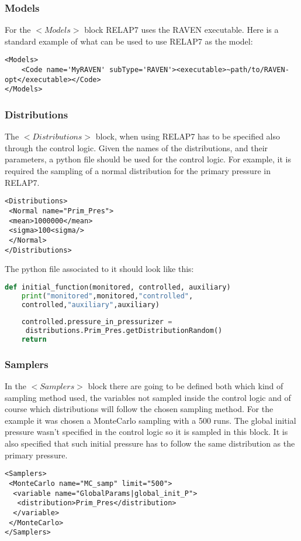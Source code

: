 \subsubsection{Models}
For the $<Models>$ block RELAP7 uses the RAVEN executable. Here is a standard example of what can be used to use RELAP7 as the model:
\begin{lstlisting}[style=XML]
<Models>
    <Code name='MyRAVEN' subType='RAVEN'><executable>~path/to/RAVEN-opt</executable></Code>
</Models>
\end{lstlisting}
\subsubsection{Distributions}
The $<Distributions>$ block, when using RELAP7 has to be specified also through the control logic.
Given the names of the distributions, and their parameters, a python file should be used for the control logic.
For example, it is required the sampling of a normal distribution for the primary pressure in RELAP7. 
\begin{lstlisting}[style=XML]
<Distributions>
 <Normal name="Prim_Pres">
 <mean>1000000</mean>
 <sigma>100<sigma/>
 </Normal>
</Distributions>
\end{lstlisting}
The python file associated to it should look like this:
\begin{lstlisting}[language=Python]
def initial_function(monitored, controlled, auxiliary)
    print("monitored",monitored,"controlled",
    controlled,"auxiliary",auxiliary)  
    
    controlled.pressure_in_pressurizer =
     distributions.Prim_Pres.getDistributionRandom()
    return
\end{lstlisting} 
\subsubsection{Samplers}
In the $<Samplers>$ block there are going to be defined both which kind of sampling method used, the variables not sampled inside the control logic and of course which distributions will follow the chosen sampling method.
For the example it was chosen a MonteCarlo sampling with a 500 runs. The global initial pressure wasn't specified in the control logic so it is sampled in this block. It is also specified that such initial pressure has to follow the same distribution as the primary pressure. 
\begin{lstlisting}[style=XML]
<Samplers>
 <MonteCarlo name="MC_samp" limit="500"> 
  <variable name="GlobalParams|global_init_P">
   <distribution>Prim_Pres</distribution>
  </variable>
 </MonteCarlo>
</Samplers>
\end{lstlisting}










